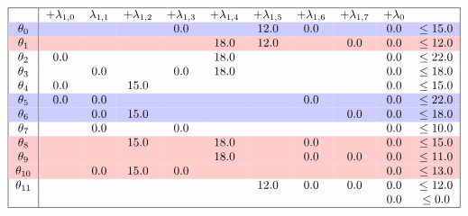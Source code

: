 \documentclass{article}
\begin{document}
    \[
        \begin{tabular}{ |c|c c c c c c c c c c| }
            \hline
            & +$\lambda_{1,0}$ & $\lambda_{1,1}$ & +$\lambda_{1,2}$ & +$\lambda_{1,3}$ & +$\lambda_{1,4}$ & +$\lambda_{1,5}$ & +$\lambda_{1,6}$ & +$\lambda_{1,7}$  & +$\lambda_{0}$ &  \\
            \rowcolor{blue!20}
            $\theta_{0}$ && & & 0.0 && 12.0 &0.0 && 0.0& $\leq 15.0$ \\
            \rowcolor{red!20}
            $\theta_{1}$ && & & & 18.0 &12.0 && 0.0 &0.0& $\leq 12.0$ \\
            $\theta_{2}$ &0.0 && & & 18.0 && & & 0.0& $\leq 22.0$ \\
            $\theta_{3}$ && 0.0 && 0.0 &18.0 && & & 0.0& $\leq 18.0$ \\
            $\theta_{4}$ &0.0 && 15.0 && & & & & 0.0& $\leq 15.0$ \\
            \rowcolor{blue!20}
            $\theta_{5}$ &0.0 &0.0 && & & & 0.0 && 0.0& $\leq 22.0$ \\
            \rowcolor{blue!20}
            $\theta_{6}$ && 0.0 &15.0 && & & & 0.0 &0.0& $\leq 18.0$ \\
            $\theta_{7}$ && 0.0 && 0.0 && & & & 0.0& $\leq 10.0$ \\
            \rowcolor{red!20}
            $\theta_{8}$ && & 15.0 && 18.0 && 0.0 && 0.0& $\leq 15.0$ \\
            \rowcolor{red!20}
            $\theta_{9}$ && & & & 18.0 && 0.0 &0.0 &0.0& $\leq 11.0$ \\
            \rowcolor{red!20}
            $\theta_{10}$ && 0.0 &15.0 &0.0 && & & & 0.0& $\leq 13.0$ \\
            $\theta_{11}$ && & & & & 12.0 &0.0 &0.0 &0.0& $\leq 12.0$ \\
            && & & & &  && & 0.0 & $\leq 0.0$ \\
            \hline
        \end{tabular}
    \]
\end{document}

